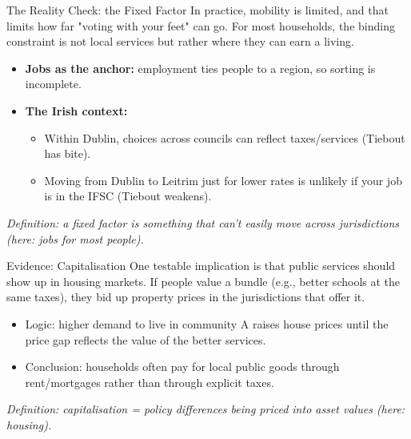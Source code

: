 \documentclass[10pt]{beamer}
\begin{document}
\begin{frame}{The Reality Check: the Fixed Factor}
In practice, mobility is limited, and that limits how far "voting with your feet" can go.
For most households, the binding constraint is not local services but rather where they can earn a living.

\begin{itemize}
\item \textbf{Jobs as the anchor:} employment ties people to a region, so sorting is incomplete.
\item \textbf{The Irish context:}
\begin{itemize}
\item Within Dublin, choices across councils can reflect taxes/services (Tiebout has bite).
\item Moving from Dublin to Leitrim just for lower rates is unlikely if your job is in the IFSC (Tiebout weakens).
\end{itemize}
\end{itemize}

\vspace{0.1cm}
\footnotesize
\textit{Definition: a fixed factor is something that can’t easily move across jurisdictions (here: jobs for most people).}
\end{frame}

\begin{frame}{Evidence: Capitalisation}
One testable implication is that public services should show up in housing markets.
If people value a bundle (e.g., better schools at the same taxes), they bid up property prices in the jurisdictions that offer it.

\begin{itemize}
\item Logic: higher demand to live in community A raises house prices until the price gap reflects the value of the better services.
\item Conclusion: households often pay for local public goods through rent/mortgages rather than through explicit taxes.
\end{itemize}

\vspace{0.15cm}
\footnotesize
\textit{Definition: capitalisation = policy differences being priced into asset values (here: housing).}
\end{frame}
\end{document}
